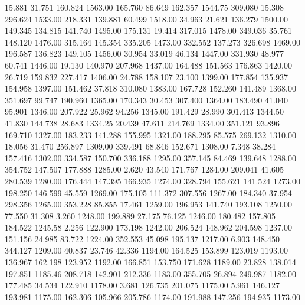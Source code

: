   15.881   31.751  160.824      1563.00
 165.760   86.649  162.357      1544.75
 309.080   15.308  296.624      1533.00
 218.331  139.881   60.499      1518.00
  34.963   21.621  136.279      1500.00
 149.345  134.815  141.740      1495.00
 175.131   19.414  317.015      1478.00
 349.036   35.761  148.120      1476.00
 315.164  145.354  335.205      1473.00
 332.552  137.273  326.698      1469.00
 196.587  136.823  149.105      1456.00
  30.954   33.019   46.134      1447.00
 331.930   48.977   60.741      1446.00
  19.130  140.970  207.968      1437.00
 164.488  151.563  176.863      1420.00
  26.719  159.832  227.417      1406.00
  24.788  158.107   23.100      1399.00
 177.854  135.937  154.958      1397.00
 151.462   37.818  310.080      1383.00
 167.728  152.260  141.489      1368.00
 351.697   99.747  190.960      1365.00
 170.343   30.453  307.400      1364.00
 183.490   41.040   95.901      1346.00
 207.922   25.962   94.256      1345.00
 191.429   28.990  301.413      1344.50
  41.830  144.738   28.683      1334.25
  20.439   47.611  214.769      1334.00
 351.121   93.896  169.710      1327.00
 183.233  141.288  155.995      1321.00
 188.295   85.575  269.132      1310.00
  18.056   31.470  256.897      1309.00
 339.491   68.846  152.671      1308.00
   7.348   38.284  157.416      1302.00
 334.587  150.700  336.188      1295.00
 357.145   84.469  139.648      1288.00
 354.752  147.507  177.888      1285.00
   2.620   43.540  171.767      1284.00
 209.041   41.605  280.539      1280.00
 176.444  147.395  166.935      1274.00
 328.794  155.621  141.524      1273.00
 198.250  146.599   45.559      1269.00
 175.105  111.372  307.556      1267.00
 184.340   37.954  298.356      1265.00
 353.228   85.855   17.461      1259.00
 196.953  141.740  193.108      1250.00
  77.550   31.308    3.260      1248.00
 199.889   27.175   76.125      1246.00
 180.482  157.805  184.522      1245.58
   2.256  122.900  173.198      1242.00
 206.524  148.962  204.598      1237.00
 151.156   24.985   83.722      1224.00
 352.553   45.098  195.137      1217.00
   6.903  148.450  344.127      1209.00
  40.837   23.746   42.336      1194.00
 164.525  153.899  123.019      1193.00
 136.967  162.198  123.952      1192.00
 166.851  153.750  171.628      1189.00
  23.828  138.014  197.851      1185.46
 208.718  142.901  212.336      1183.00
 355.705   26.894  249.987      1182.00
 177.485   34.534  122.910      1178.00
   3.681  126.735  201.075      1175.00
   5.961  146.127  193.981      1175.00
 162.306  105.966  205.786      1174.00
 191.988  147.256  194.935      1173.00
